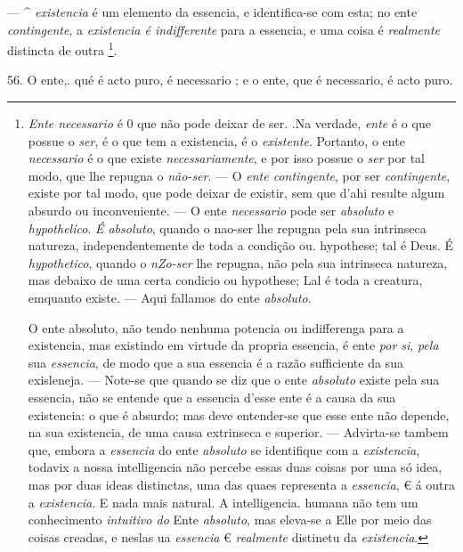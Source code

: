 --- \textasciicircum{}  \emph{existencia} é um elemento da essencia, e identifica-se com esta; no ente \emph{contingente}, a \emph{existencia é indifferente} para a essencia, e uma coisa é \emph{realmente} distincta de outra \footnote{\emph{Ente necessario} é 0 que não pode deixar de ser. .Na verdade, \emph{ente} é o que possue o \emph{ser}, é o que tem a existencia, é o \emph{existente}. Portanto, o ente \emph{necessario} é o que existe \emph{necessariamente}, e por isso possue o \emph{ser} por tal modo, que lhe repugna o \emph{não-ser}. --- O \emph{ente contingente}, por ser \emph{contingente}, existe por tal modo, que pode deixar de existir, sem que d'ahi resulte algum absurdo ou inconveniente. --- O ente \emph{necessario} pode ser \emph{absoluto} e \emph{hypothelico}. \emph{É absoluto}, quando o nao-ser lhe repugna pela sua intrinseca natureza, independentemente de toda a condição ou. hypothese; tal é Deus. É \emph{hypothetico}, quando o \emph{nZo-ser} lhe repugna, não pela sua intrinseca natureza, mas debaixo de uma certa condicio ou hypothese; Lal é toda a creatura, emquanto existe. --- Aqui fallamos do ente \emph{absoluto}.\par O ente absoluto, não tendo nenhuma potencia ou indifferenga para a existencia, mas existindo em virtude da propria essencia, é ente \emph{por si}, \emph{pela} sua \emph{essencia}, de modo que a sua essencia é a razão sufficiente da sua exisleneja. --- Note-se que quando se diz que o ente \emph{absoluto} existe pela sua essencia, não se entende que a essencia d'esse ente é a causa da sua existencia: o que é absurdo; mas deve entender-se que esse ente não depende, na sua existencia, de uma causa extrinseca e superior. --- Advirta-se tambem que, embora a \emph{essencia} do ente \emph{absoluto} se identifique com a \emph{existencia}, todavix a nossa intelligencia não percebe essas duas coisas por uma só idea, mas por duas ideas distinctas, uma das quaes representa a \emph{essencia}, € á outra a \emph{existencia}. E nada mais natural. A intelligencia. humana não tem um conhecimento \emph{intuitivo do} Ente \emph{absoluto}, mas eleva-se a Elle por meio das coisas creadas, e neslas ua \emph{essencia} € \emph{realmente} distinetu da \emph{existencia}.}.

 56. O ente,. qué é acto puro, é necessario ; e o ente, que é necessario, é acto puro.

